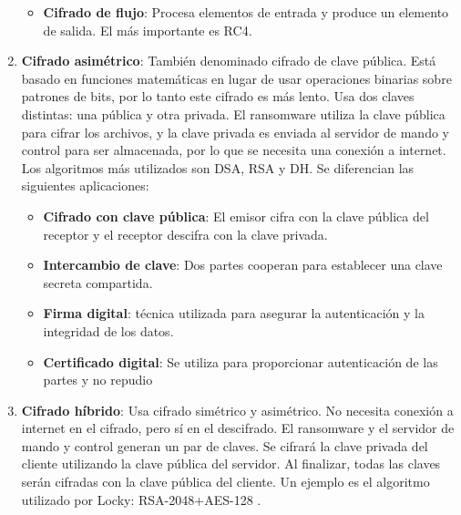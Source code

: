 \begin{enumerate}
\begin{itemize}
        \item \textbf{Cifrado de flujo}: Procesa elementos de entrada y produce un elemento de salida. El más importante es \gls{RC4}.
        
    \end{itemize}
    
    \item \textbf{Cifrado asimétrico}: También denominado cifrado de clave pública. Está basado en funciones matemáticas en lugar de usar operaciones binarias sobre patrones de bits, por lo tanto este cifrado es más lento. Usa dos claves distintas: una pública y otra privada. El ransomware utiliza la clave pública para cifrar los archivos, y la clave privada es enviada al servidor de mando y control para ser almacenada, por lo que se necesita una conexión a internet. Los algoritmos más utilizados son \gls{DSA}, \gls{RSA} y \gls{DH}. Se diferencian las siguientes aplicaciones:
    \begin{itemize}
        \item \textbf{Cifrado con clave pública}: El emisor cifra con la clave pública del receptor y el receptor descifra con la clave privada.
        \item \textbf{Intercambio de clave}: Dos partes cooperan para establecer una clave secreta compartida.
        \item \textbf{Firma digital}: técnica utilizada para asegurar la autenticación y la integridad de los datos.
        \item \textbf{Certificado digital}: Se utiliza para proporcionar autenticación de las partes y no repudio
    \end{itemize}
    
    \item \textbf{Cifrado híbrido}: Usa cifrado simétrico y asimétrico. No necesita conexión a internet en el cifrado, pero sí en el descifrado. El ransomware y el servidor de mando y control generan un par de claves. Se cifrará la clave privada del cliente utilizando la clave pública del servidor. Al finalizar, todas las claves serán cifradas con la clave pública del cliente. Un ejemplo es el algoritmo utilizado por Locky: \gls{RSA}-2048+\gls{AES}-128 \cite{ransEncr}.
\end{enumerate}

